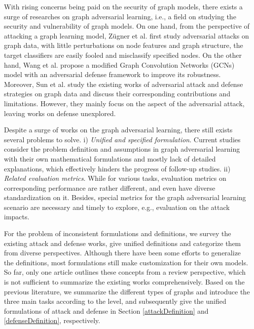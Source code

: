 With rising concerns being paid on the security of graph models, there exists a surge of researches on graph adversarial learning, i.e., a field on studying the security and vulnerability of graph models. On one hand, from the perspective of attacking a graph learning model, Z\"ugner et al. \cite{zugner2018adversarial} first study adversarial attacks on graph data, with little perturbations on node features and graph structure, the target classifiers are easily fooled and misclassify specified nodes. On the other hand, Wang et al. \cite{wang2019adversarial} propose a modified Graph Convolution Networks (GCNs) model with an adversarial defense framework to improve its robustness. Moreover, Sun et al. \cite{sun2018adversarial} study the existing works of adversarial attack and defense strategies on graph data and discuss their corresponding contributions and limitations. However, they mainly focus on the aspect of the adversarial attack, leaving works on defense unexplored.

 Despite a surge of works on the graph adversarial learning, there still exists several problems to solve. i) \emph{Unified and specified formulation}. Current studies consider the problem definition and assumptions in graph adversarial learning with their own mathematical formulations and mostly lack of detailed explanations, which effectively hinders the progress of follow-up studies. ii) \emph{Related evaluation metrics}. While for various tasks, evaluation metrics on corresponding performance are rather different, and even have diverse standardization on it. Besides, special metrics for the graph adversarial learning scenario are necessary and timely to explore, e.g., evaluation on the attack impacts.

For the problem of inconsistent formulations and definitions, we survey the existing attack and defense works, give unified definitions and categorize them from diverse perspectives. Although there have been some efforts \cite{zugner2018adversarial,ma2019attacking,dai2018adversarial} to generalize the definitions, most formulations still make customization for their own models. So far, only one article \cite{sun2018adversarial} outlines these concepts from a review perspective, which is not sufficient to summarize the existing works comprehensively. Based on the previous literature, we summarize the different types of graphs and introduce the three main tasks according to the level, and subsequently give the unified formulations of attack and defense in Section \ref{attackDefinition} and \ref{defenseDefinition}, respectively.

